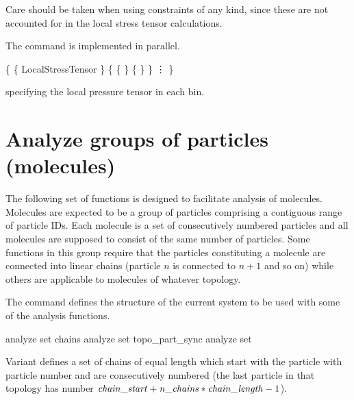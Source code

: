 Care should be taken when using constraints of any kind, since these are not accounted for
in the local stress tensor calculations. 

The command is implemented in parallel.


\begin{code}
\{ \{ LocalStressTensor \}
   \{ \{    \} \{  \} \}
      \vdots
\}
\end{code}
specifying the local pressure tensor in each bin.

\section{Analyze groups of particles (molecules)}
\label{analyze:set}

The following set of functions is designed to facilitate analysis of molecules. Molecules are expected to be a group of particles
comprising a contiguous range of particle IDs. Each molecule
is a set of consecutively numbered particles and all molecules
are supposed to consist of the same number of particles.
Some functions in this group require that the particles constituting
a molecule are connected into linear chains (particle $n$ is connected
to $n+1$ and so on) while others are applicable to molecules
of whatever topology.

The  command defines the structure of the current
system to be used with some of the analysis functions.

\begin{essyntax}
   analyze set chains 
   analyze set topo\_part\_sync
   analyze set
\end{essyntax}

Variant  defines a set of  chains of equal
length  which start with the particle with particle
number  and are consecutively numbered (\ie the last
particle in that topology has number $\var{chain\_start} +
\var{n\_chains}*\var{chain\_length} - 1$). 

